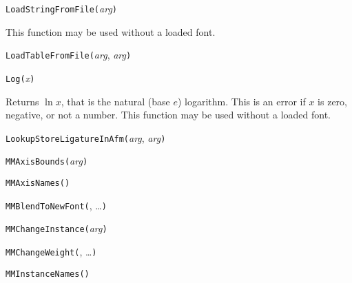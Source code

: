 \texttt{LoadStringFromFile(}\textit{arg}\texttt{)}

This function may be used without a loaded font.



\texttt{LoadTableFromFile(}\textit{arg}, \textit{arg}\texttt{)}



\texttt{Log(}\textit{x}\texttt{)}

Returns $\ln x$, that is the natural (base $e$) logarithm.  This is an error
if $x$ is zero, negative, or not a number.
This function may be used without a loaded font.



\texttt{LookupStoreLigatureInAfm(}\textit{arg}, \textit{arg}\texttt{)}



\texttt{MMAxisBounds(}\textit{arg}\texttt{)}



\texttt{MMAxisNames(}\texttt{)}



\texttt{MMBlendToNewFont(}, \ldots\texttt{)}



\texttt{MMChangeInstance(}\textit{arg}\texttt{)}



\texttt{MMChangeWeight(}, \ldots\texttt{)}



\texttt{MMInstanceNames(}\texttt{)}



